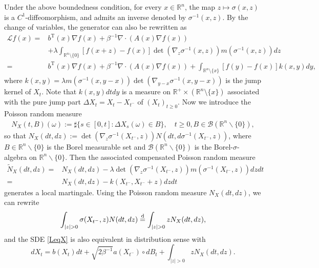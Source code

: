 \documentclass[10pt]{article}
\theoremstyle{definition}
\numberwithin{equation}{section}
\newcommand{\lam}{\lambda}
\begin{document}
Under the above boundedness condition, for every $x \in \mathbb{R}^n$, the map $z \mapsto \sigma(x,z)$ is a $C^1$-diffeomorphism, and admits an inverse denoted by $\sigma^{-1}(x,z)$. By the change of variables, the generator can also be rewritten as
\begin{align*}
    \mathcal{L}f(x) = & b^\mathrm{T}(x) \nabla f(x) + \beta^{-1} \nabla\cdot (A(x)\nabla f(x))  \\
      & + \lambda \int_{\mathbb{R}^{n}\setminus \{0\}} [f(x+z)- f(x)] \det(\nabla_{z}\sigma^{-1}(x,z))m(\sigma^{-1}(x,z))dz \\
    = & b^\mathrm{T}(x) \nabla f(x) + \beta^{-1} \nabla\cdot (A(x)\nabla f(x)) +   \int_{\mathbb{R}^{n}\setminus \{x\}} [f(y)-f(x)] k(x,y)dy,
    \end{align*}
where $k(x,y) = \lambda m(\sigma^{-1}(x,y- x))\det(\nabla_{y-x}\sigma^{-1}(x,y-x))$ is the jump kernel of $X_t$. Note that $k(x,y)dtdy$ is a measure on $\mathbb{R}^{+}\times(\mathbb{R}^n\setminus\{x\})$ associated with the pure jump part $\Delta X_t = X_t - X_{t^{-}}$ of $(X_t)_{t\geq0}$. Now we introduce the Poisson random measure 
\begin{align*}
    N_X(t,B)(\omega):= \sharp \{s\in [0,t]:\Delta X_{s}(\omega) \in B\}, \quad t\geq 0, B\in \mathscr{B}(\mathbb{R}^{n}\backslash \{0\}),
\end{align*}
so that $N_X(dt,dz):= \det(\nabla_z \sigma^{-1}(X_{t^{-}},z))N(dt, d\sigma^{-1}(X_{t^{-}},z))$, where $B \in \mathbb{R}^{n}\backslash \{0\}$ is the Borel measurable set and $\mathscr{B}(\mathbb{R}^{n}\backslash \{0\})$ is the Borel-$\sigma$-algebra on $\mathbb{R}^{n}\backslash \{0\}$. Then the associated compensated Poisson random measure 
\begin{align*}
    \widetilde{N}_X(dt,dz) = & N_X(dt,dz) - \lam\det(\nabla_z \sigma^{-1}(X_{t^{-}}, z))m(\sigma^{-1}(X_{t^{-}},z))dzdt \\
    = & N_X(dt,dz) -k(X_{t^{-}},X_{t^{-}} +z)dzdt
\end{align*}
generates a local martingale.
Using the Poisson random measure $N_X(dt,dz)$, we can rewrite
\begin{equation*}
    \int_{|z|>0} \sigma(X_{t^-},z) N(dt,dz) \overset{\text d}{=} \int_{|z|>0} z N_X(dt,dz),
\end{equation*}
and the SDE \eqref{LeqX} is also equivalent in distribution sense with
\begin{equation*}
     dX_t =  b(X_{t})dt +  \sqrt{2\beta^{-1}} a(X_{t^-}) \circ dB_t  + \int_{|z|>0} z N_X(dt,dz).
\end{equation*}
\end{document}

